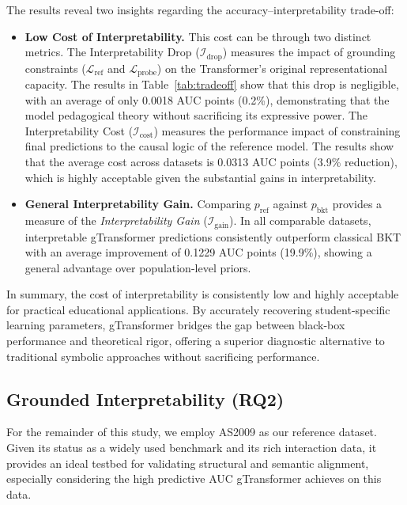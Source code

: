 \documentclass[applsci,article,submit,moreauthors,pdftex]{Definitions/mdpi}
\begin{document}
The results reveal two insights regarding the accuracy--interpretability trade-off:

\begin{itemize}
    \item \textbf{Low Cost of Interpretability.} This cost can be  through two distinct metrics. The Interpretability Drop ($\mathcal{I}_{\text{drop}}$) measures the impact of grounding constraints ($\mathcal{L}_{\text{ref}}$ and $\mathcal{L}_{\text{probe}}$) on the Transformer's original representational capacity. The results in Table~\ref{tab:tradeoff} show that this drop is negligible, with an average of only 0.0018 AUC points (0.2\%), demonstrating that the model  pedagogical theory without sacrificing its expressive power. The Interpretability Cost ($\mathcal{I}_{\text{cost}}$) measures the performance impact of constraining final predictions to the causal logic of the reference model. The results show that the average cost across datasets is 0.0313 AUC points (3.9\% reduction), which is highly acceptable given the substantial gains in interpretability.
    
    \item \textbf{General Interpretability Gain.} Comparing $p_{\text{ref}}$ against $p_{\text{bkt}}$ provides a measure of the \textit{Interpretability Gain} ($\mathcal{I}_{\text{gain}}$). In all comparable datasets, interpretable gTransformer predictions consistently outperform classical BKT with an average improvement of 0.1229 AUC points (19.9\%), showing a general advantage over population-level priors. 
\end{itemize}

In summary, the cost of interpretability is consistently low and highly acceptable for practical educational applications. By accurately recovering student-specific learning parameters, gTransformer bridges the gap between black-box performance and theoretical rigor, offering a superior diagnostic alternative to traditional symbolic approaches without sacrificing performance.


\subsection{Grounded Interpretability (RQ2)} \label{sec_grounded}

For the remainder of this study, we employ AS2009 as our reference dataset. Given its status as a widely used benchmark and its rich interaction data, it provides an ideal testbed for validating structural and semantic alignment, especially considering the high predictive AUC gTransformer achieves on this data.
\end{document}
